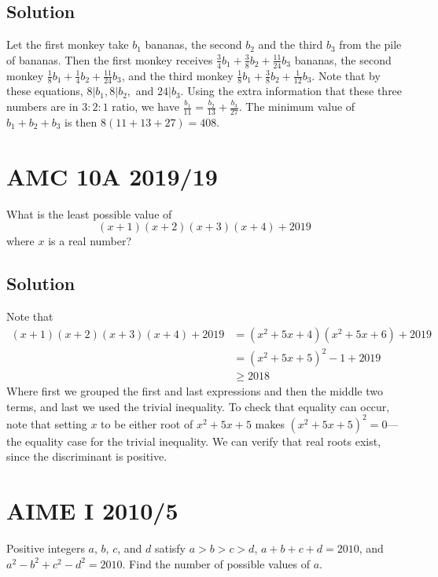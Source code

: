 \documentclass{article}
\begin{document}
\subsection{Solution}
Let the first monkey take $b_1$ bananas, the second $b_2$ and the third $b_3$ from the pile of bananas. Then the first monkey receives $\frac34b_1+\frac38b_2+\frac{11}{24}b_3$ bananas, the second monkey $\frac 18 b_1+\frac14b_2+\frac{11}{24}b_3$, and the third monkey $\frac18b_1+\frac38b_2+\frac1{12}b_3$. Note that by these equations, $8|b_1,8|b_2,$ and $24|b_3$. Using the extra information that these three numbers are in $3:2:1$ ratio, we have $\frac{b_1}{11}=\frac{b_2}{13}+\frac{b_3}{27}$. The minimum value of $b_1+b_2+b_3$ is then $8(11+13+27)=408$.

\pagebreak\section{AMC 10A 2019/19}
What is the least possible value of\[(x+1)(x+2)(x+3)(x+4)+2019\]where $x$ is a real number?
\subsection{Solution}
Note that
\begin{align*}
    (x+1)(x+2)(x+3)(x+4)+2019&=(x^2+5x+4)(x^2+5x+6)+2019\\&=(x^2+5x+5)^2-1+2019\\&\ge 2018
\end{align*}
Where first we grouped the first and last expressions and then the middle two terms, and last we used the trivial inequality. To check that equality can occur, note that setting $x$ to be either root of $x^2+5x+5$ makes $(x^2+5x+5)^2=0$—the equality case for the trivial inequality. We can verify that real roots exist, since the discriminant is positive.
\pagebreak\section{AIME I 2010/5}
Positive integers $a$, $b$, $c$, and $d$ satisfy $a > b > c > d$, $a + b + c + d = 2010$, and $a^2 - b^2 + c^2 - d^2 = 2010$. Find the number of possible values of $a$.
\end{document}
